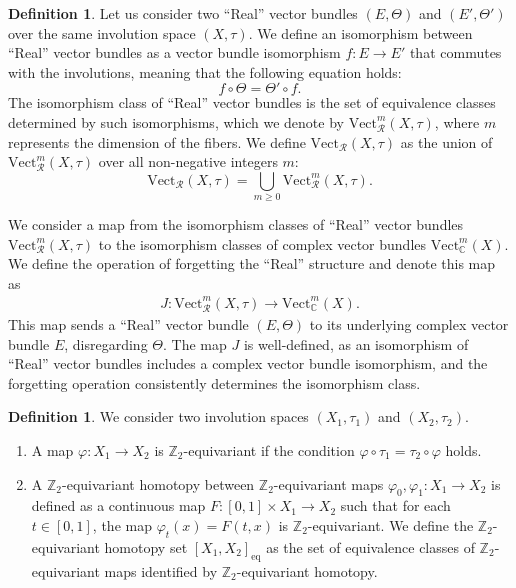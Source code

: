 \documentclass{amsart}
\theoremstyle{definition}
\newtheorem{dfn}[thm]{Definition}
\theoremstyle{remark}
\begin{document}
\begin{dfn}
Let us consider two “Real” vector bundles \((E, \Theta)\) and \((E', \Theta')\) over the same involution space \((X, \tau)\). We define an isomorphism between “Real” vector bundles as a vector bundle isomorphism \(f \colon E \to E'\) that commutes with the involutions, meaning that the following equation holds:
\[
f \circ \Theta = \Theta' \circ f.
\]
The isomorphism class of “Real” vector bundles is the set of equivalence classes determined by such isomorphisms, which we denote by \(\text{Vect}_{\mathcal{R}}^m(X, \tau)\), where \(m\) represents the dimension of the fibers. We define $\mathrm{Vect}_{\mathcal{R}}(X, \tau)$ as the union of $\mathrm{Vect}_{\mathcal{R}}^m(X, \tau)$ over all non-negative integers $m$:
\[
\mathrm{Vect}_{\mathcal{R}}(X, \tau) = \bigcup_{m \geq 0} \mathrm{Vect}_{\mathcal{R}}^m(X, \tau).
\]
\end{dfn}

 We consider a map from the isomorphism classes of “Real” vector bundles \(\text{Vect}_{\mathcal{R}}^m(X, \tau)\) to the isomorphism classes of complex vector bundles \(\text{Vect}_{\mathbb{C}}^m(X)\). We define the operation of forgetting the “Real” structure and denote this map as 
\begin{align*}                        
J: \text{Vect}_{\mathcal{R}}^m(X, \tau) \to \text{Vect}_{\mathbb{C}}^m(X).
\end{align*}
This map sends a “Real” vector bundle \((E, \Theta)\) to its underlying complex vector bundle \(E\), disregarding \(\Theta\). The map \( J \) is well-defined, as an isomorphism of “Real” vector bundles includes a complex vector bundle isomorphism, and the forgetting operation consistently determines the isomorphism class.

\begin{dfn}
We consider two involution spaces \((X_1, \tau_1)\) and \((X_2, \tau_2)\).
\begin{enumerate}
\item A map \(\varphi: X_1 \to X_2\) is \(\mathbb{Z}_2\)-equivariant if the condition \(\varphi \circ \tau_1 = \tau_2 \circ \varphi\) holds. 
\item A \(\mathbb{Z}_2\)-equivariant homotopy between \(\mathbb{Z}_2\)-equivariant maps \(\varphi_0, \varphi_1: X_1 \to X_2\) is defined as a continuous map \( F: [0,1] \times X_1 \to X_2 \) such that for each \( t \in [0,1] \), the map \(\varphi_t(x) = F(t, x)\) is \(\mathbb{Z}_2\)-equivariant. We define the \(\mathbb{Z}_2\)-equivariant homotopy set \([X_1, X_2]_{\text{eq}}\) as the set of equivalence classes of \(\mathbb{Z}_2\)-equivariant maps identified by \(\mathbb{Z}_2\)-equivariant homotopy.
\end{enumerate}
\end{dfn}
\end{document}
